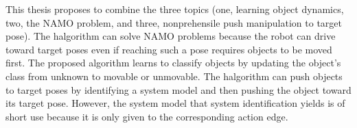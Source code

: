 This thesis proposes to combine the three topics (one, learning object dynamics, two, the \ac{NAMO} problem, and three, nonprehensile push manipulation to target pose). The \ac{halgorithm} can solve \ac{NAMO} problems because the robot can drive toward target poses even if reaching such a pose requires objects to be moved first. The proposed algorithm learns to classify objects by updating the object's class from unknown to movable or unmovable. The \ac{halgorithm} can push objects to target poses by identifying a system model and then pushing the object toward its target pose. However, the system model that system identification yields is of short use because it is only given to the corresponding action edge.\bs

